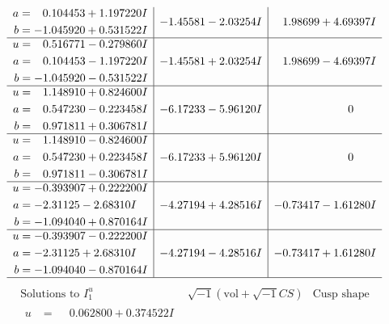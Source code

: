 \documentclass[1p]{elsarticle_modified}
\theoremstyle{definition}
\newcommand{\I}{\sqrt{-1}}
\begin{document}
$$\begin{array}{c|c|c}
\begin{aligned}
a &= \phantom{-}0.104453 + 1.197220 I \\
b &= -1.045920 + 0.531522 I\end{aligned}
 & -1.45581 - 2.03254 I & \phantom{-}1.98699 + 4.69397 I \\ \hline\begin{aligned}
u &= \phantom{-}0.516771 - 0.279860 I \\
a &= \phantom{-}0.104453 - 1.197220 I \\
b &= -1.045920 - 0.531522 I\end{aligned}
 & -1.45581 + 2.03254 I & \phantom{-}1.98699 - 4.69397 I \\ \hline\begin{aligned}
u &= \phantom{-}1.148910 + 0.824600 I \\
a &= \phantom{-}0.547230 - 0.223458 I \\
b &= \phantom{-}0.971811 + 0.306781 I\end{aligned}
 & -6.17233 - 5.96120 I & \phantom{-0.000000 } 0 \\ \hline\begin{aligned}
u &= \phantom{-}1.148910 - 0.824600 I \\
a &= \phantom{-}0.547230 + 0.223458 I \\
b &= \phantom{-}0.971811 - 0.306781 I\end{aligned}
 & -6.17233 + 5.96120 I & \phantom{-0.000000 } 0 \\ \hline\begin{aligned}
u &= -0.393907 + 0.222200 I \\
a &= -2.31125 - 2.68310 I \\
b &= -1.094040 + 0.870164 I\end{aligned}
 & -4.27194 + 4.28516 I & -0.73417 - 1.61280 I \\ \hline\begin{aligned}
u &= -0.393907 - 0.222200 I \\
a &= -2.31125 + 2.68310 I \\
b &= -1.094040 - 0.870164 I\end{aligned}
 & -4.27194 - 4.28516 I & -0.73417 + 1.61280 I\\
 \hline 
 \end{array}$$\newpage$$\begin{array}{c|c|c}  
\text{Solutions to }I^u_{1}& \I (\text{vol} + \sqrt{-1}CS) & \text{Cusp shape}\\
 \hline 
\begin{aligned}
u &= \phantom{-}0.062800 + 0.374522 I \\

\end{aligned}
\end{array}$$
\end{document}
